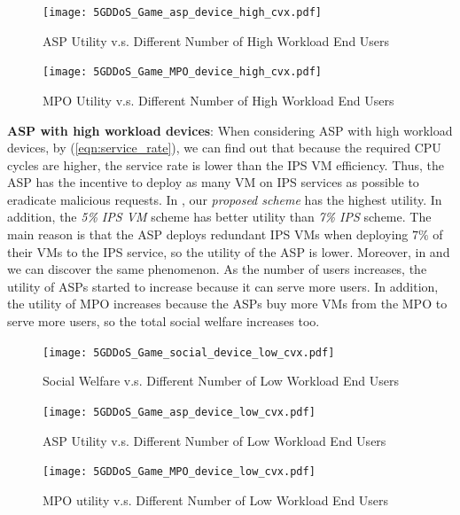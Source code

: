\documentclass[conference]{IEEEtran}
\begin{document}
\begin{figure}[!ht]
  \texttt{[image: 5GDDoS\_Game\_asp\_device\_high\_cvx.pdf]}
    \caption{ASP Utility v.s. Different Number of High Workload End Users}
\label{fig:num_cmp_asp_high}
\end{figure}

\begin{figure}[!ht]
  \texttt{[image: 5GDDoS\_Game\_MPO\_device\_high\_cvx.pdf]}
    \caption{MPO Utility v.s. Different Number of High Workload End Users}
\label{fig:num_cmp_mpo_high}
\end{figure}

\textbf{ASP with high workload devices}: 
When considering ASP with high workload devices, by (\ref{eqn:service_rate}), we can find out that because the required CPU cycles are higher, the service rate is lower than the IPS VM efficiency. Thus, the ASP has the incentive to deploy as many VM on IPS services as possible to eradicate malicious requests. In , our \textit{proposed scheme} has the highest utility. In addition, the \textit{5\% IPS VM} scheme has better utility than \textit{7\% IPS } scheme. The main reason is that the ASP deploys redundant IPS VMs when deploying $7\%$ of their VMs to the IPS service, so the utility of the ASP is lower. Moreover, in  and  we can discover the same phenomenon. As the number of users increases, the utility of ASPs started to increase because it can serve more users. In addition, the utility of MPO increases because the ASPs buy more VMs from the MPO to serve more users, so the total social welfare increases too.

\begin{figure}[!ht]
  \texttt{[image: 5GDDoS\_Game\_social\_device\_low\_cvx.pdf]}
    \caption{Social Welfare v.s. Different Number of Low Workload End Users}
\label{fig:num_cmp_soc_low}
\end{figure}

\begin{figure}[!ht]
  \texttt{[image: 5GDDoS\_Game\_asp\_device\_low\_cvx.pdf]}
    \caption{ASP Utility v.s. Different Number of Low Workload End Users}
\label{fig:num_cmp_asp_low}
\end{figure}

\begin{figure}[!ht]
  \texttt{[image: 5GDDoS\_Game\_MPO\_device\_low\_cvx.pdf]}
    \caption{MPO utility v.s. Different Number of Low Workload End Users}
\label{fig:num_cmp_mpo_low}
\end{figure}
\end{document}
